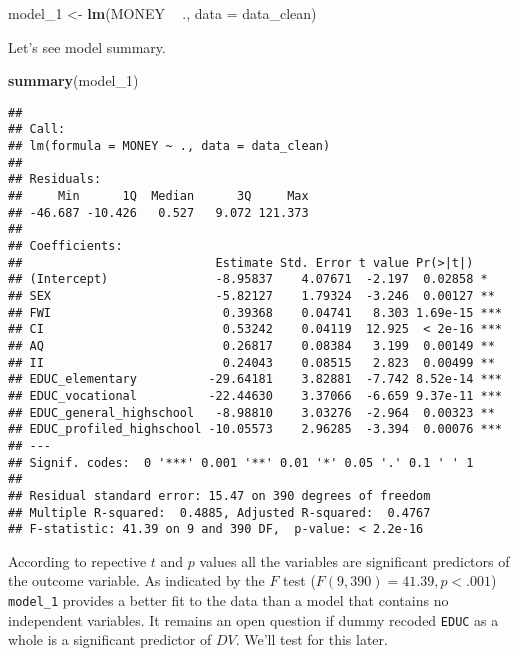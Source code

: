 \documentclass[]{article}
\newenvironment{Shaded}{\begin{snugshade}}{\end{snugshade}}
\newcommand{\DataTypeTok}[1]{\textcolor[rgb]{0.13,0.29,0.53}{#1}}
\newcommand{\DecValTok}[1]{\textcolor[rgb]{0.00,0.00,0.81}{#1}}
\newcommand{\KeywordTok}[1]{\textcolor[rgb]{0.13,0.29,0.53}{\textbf{#1}}}
\newcommand{\NormalTok}[1]{#1}
\newcommand{\OperatorTok}[1]{\textcolor[rgb]{0.81,0.36,0.00}{\textbf{#1}}}
\newcommand{\StringTok}[1]{\textcolor[rgb]{0.31,0.60,0.02}{#1}}
\begin{document}
\begin{Shaded}
\begin{Highlighting}[]
\NormalTok{model_}\DecValTok{1}\NormalTok{ <-}\StringTok{ }\KeywordTok{lm}\NormalTok{(MONEY }\OperatorTok{~}\StringTok{ }\NormalTok{., }\DataTypeTok{data =}\NormalTok{ data_clean)}
\end{Highlighting}
\end{Shaded}

Let's see model summary.

\begin{Shaded}
\begin{Highlighting}[]
\KeywordTok{summary}\NormalTok{(model_}\DecValTok{1}\NormalTok{)}
\end{Highlighting}
\end{Shaded}

\begin{verbatim}
## 
## Call:
## lm(formula = MONEY ~ ., data = data_clean)
## 
## Residuals:
##     Min      1Q  Median      3Q     Max 
## -46.687 -10.426   0.527   9.072 121.373 
## 
## Coefficients:
##                           Estimate Std. Error t value Pr(>|t|)    
## (Intercept)               -8.95837    4.07671  -2.197  0.02858 *  
## SEX                       -5.82127    1.79324  -3.246  0.00127 ** 
## FWI                        0.39368    0.04741   8.303 1.69e-15 ***
## CI                         0.53242    0.04119  12.925  < 2e-16 ***
## AQ                         0.26817    0.08384   3.199  0.00149 ** 
## II                         0.24043    0.08515   2.823  0.00499 ** 
## EDUC_elementary          -29.64181    3.82881  -7.742 8.52e-14 ***
## EDUC_vocational          -22.44630    3.37066  -6.659 9.37e-11 ***
## EDUC_general_highschool   -8.98810    3.03276  -2.964  0.00323 ** 
## EDUC_profiled_highschool -10.05573    2.96285  -3.394  0.00076 ***
## ---
## Signif. codes:  0 '***' 0.001 '**' 0.01 '*' 0.05 '.' 0.1 ' ' 1
## 
## Residual standard error: 15.47 on 390 degrees of freedom
## Multiple R-squared:  0.4885, Adjusted R-squared:  0.4767 
## F-statistic: 41.39 on 9 and 390 DF,  p-value: < 2.2e-16
\end{verbatim}

According to repective \(t\) and \(p\) values all the variables are
significant predictors of the outcome variable. As indicated by the
\(F\) test (\(F(9, 390) = 41.39, p < .001\)) \texttt{model\_1} provides
a better fit to the data than a model that contains no independent
variables. It remains an open question if dummy recoded \texttt{EDUC} as
a whole is a significant predictor of \(DV\). We'll test for this later.
\end{document}
